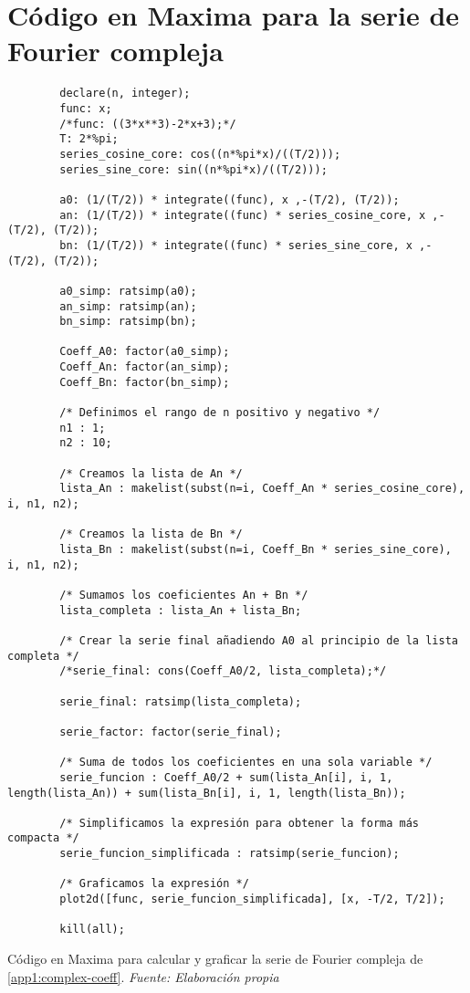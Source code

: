 \section{Código en Maxima para la serie de Fourier compleja}\label{app2:complex-code-maxima}
\begin{longlisting}
	\begin{verbatim}
		declare(n, integer);
		func: x;
		/*func: ((3*x**3)-2*x+3);*/
		T: 2*%pi;
		series_cosine_core: cos((n*%pi*x)/((T/2)));
		series_sine_core: sin((n*%pi*x)/((T/2)));
		
		a0: (1/(T/2)) * integrate((func), x ,-(T/2), (T/2));
		an: (1/(T/2)) * integrate((func) * series_cosine_core, x ,-(T/2), (T/2));
		bn: (1/(T/2)) * integrate((func) * series_sine_core, x ,-(T/2), (T/2));
		
		a0_simp: ratsimp(a0);
		an_simp: ratsimp(an);
		bn_simp: ratsimp(bn);
		
		Coeff_A0: factor(a0_simp);
		Coeff_An: factor(an_simp);
		Coeff_Bn: factor(bn_simp);
		
		/* Definimos el rango de n positivo y negativo */
		n1 : 1;
		n2 : 10;
		
		/* Creamos la lista de An */
		lista_An : makelist(subst(n=i, Coeff_An * series_cosine_core), i, n1, n2);
		
		/* Creamos la lista de Bn */
		lista_Bn : makelist(subst(n=i, Coeff_Bn * series_sine_core), i, n1, n2);
		
		/* Sumamos los coeficientes An + Bn */
		lista_completa : lista_An + lista_Bn;
		
		/* Crear la serie final añadiendo A0 al principio de la lista completa */
		/*serie_final: cons(Coeff_A0/2, lista_completa);*/
		
		serie_final: ratsimp(lista_completa);
		
		serie_factor: factor(serie_final);
		
		/* Suma de todos los coeficientes en una sola variable */
		serie_funcion : Coeff_A0/2 + sum(lista_An[i], i, 1, length(lista_An)) + sum(lista_Bn[i], i, 1, length(lista_Bn));
		
		/* Simplificamos la expresión para obtener la forma más compacta */
		serie_funcion_simplificada : ratsimp(serie_funcion);
		
		/* Graficamos la expresión */
		plot2d([func, serie_funcion_simplificada], [x, -T/2, T/2]);
		
		kill(all);	
	\end{verbatim}
	\caption[Código en Maxima para calcular y graficar la serie de Fourier compleja de \ref{app1:complex-coeff}.] {Código en Maxima para calcular y graficar la serie de Fourier compleja de \ref{app1:complex-coeff}. \textit{Fuente: Elaboración propia}} 
\end{longlisting}


